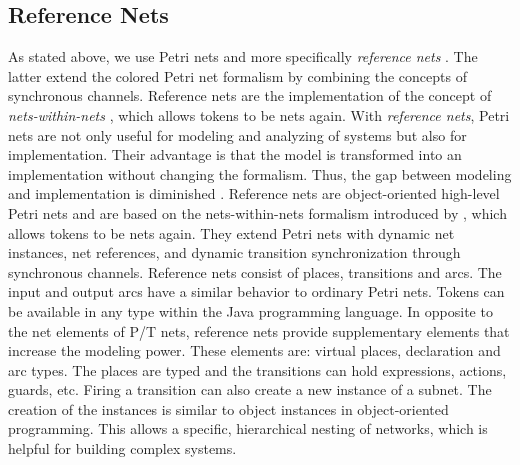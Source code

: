 \subsection{Reference Nets}
%
As stated above, we use Petri nets and more specifically \textit{reference nets} \cite{Kummer02}.%
%
The latter extend the colored Petri net formalism by combining the concepts of synchronous channels.
%
Reference nets \cite{reference15} are the implementation of the concept of \emph{nets-within-nets} \cite{Valk98}, which allows tokens to be nets again.
%
With \textit{reference nets}, Petri nets are not only useful for modeling and analyzing of systems but also for implementation.
%
Their advantage is that the model is transformed into an implementation without changing the formalism.
%
Thus, the gap between modeling and implementation is diminished \cite{Cabac09c}.
%
%
Reference nets are object-oriented high-level Petri nets and are based on the nets-within-nets formalism introduced by \cite{Valk98}, which allows tokens to be nets again.
%
They extend Petri nets with dynamic net instances, net references, and dynamic transition synchronization through synchronous channels. Reference nets consist of places, transitions and arcs. 
%
The input and output arcs have a similar behavior to ordinary Petri nets. 
%
Tokens can be available in any type within the Java programming language.
%
In opposite to the net elements of P/T nets, reference nets provide supplementary elements that increase the modeling power. 
%
These elements are: virtual places, declaration and arc types.
%
The places are typed and the transitions can hold expressions, actions, guards, etc.
%
Firing a transition can also create a new instance of a subnet.
%
The creation of the instances is similar to object instances in object-oriented programming.
%
This allows a specific, hierarchical nesting of networks, which is helpful for building complex systems.


